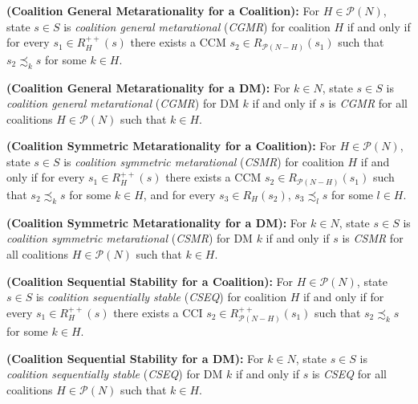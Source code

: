 \begin{definition}\label{def-cgmr-coal}
\rm {\bf (Coalition General Metarationality for a Coalition):}
For $H \in \mathcal{P}(N)$, state $s \in S$ is \emph{coalition general metarational} (\emph{CGMR}) for coalition $H$ if and only if for every $s_1 \in R_H^{++}(s)$ there exists a CCM $s_2 \in R_{\mathcal{P}(N-H)}(s_1)$ such that $s_2 \precsim_k s$ for some $k \in H$.
\end{definition}

\begin{definition}\label{def-cgmr-dm}
\rm {\bf (Coalition General Metarationality for a DM):} For $k \in N$, state $s \in S$ is \emph{coalition general metarational} (\emph{CGMR}) for DM $k$ if and only if $s$ is \emph{CGMR} for all coalitions $H \in \mathcal{P}(N)$ such that $k \in H$.
\end{definition}

\begin{definition}\label{def-csmr-coal}
\rm {\bf (Coalition Symmetric Metarationality for a Coalition):} For $H \in \mathcal{P}(N)$, state $s \in S$ is \emph{coalition symmetric metarational} (\emph{CSMR}) for coalition $H$ if and only if for every $s_1 \in R_H^{++}(s)$ there exists a CCM $s_2 \in R_{\mathcal{P}(N-H)}(s_1)$ such that $s_2 \precsim_k s$ for some $k \in H$, and for every $s_3 \in R_H(s_2)$, $s_3 \precsim_l s$ for some $l \in H$.
\end{definition}

\begin{definition}\label{def-csmr-dm}
\rm {\bf (Coalition Symmetric Metarationality for a DM):} For $k \in N$, state $s \in S$ is \emph{coalition symmetric metarational} (\emph{CSMR}) for DM $k$ if and only if $s$ is \emph{CSMR} for all coalitions $H \in \mathcal{P}(N)$ such that $k \in H$.
\end{definition}

\begin{definition}\label{def-cseq-coal}
\rm {\bf (Coalition Sequential Stability for a Coalition):}
For $H \in \mathcal{P}(N)$, state $s \in S$ is \emph{coalition sequentially stable} (\emph{CSEQ}) for coalition $H$ if and only if for every $s_1 \in R_H^{++}(s)$ there exists a CCI $s_2 \in R_{\mathcal{P}(N-H)}^{++}(s_1)$ such that $s_2 \precsim_k s$ for some $k \in H$.
\end{definition}

\begin{definition}\label{def-cseq-dm}
\rm {\bf (Coalition Sequential Stability for a DM):} For $k \in N$, state $s \in S$ is \emph{coalition sequentially stable} (\emph{CSEQ}) for DM $k$ if and only if $s$ is \emph{CSEQ} for all coalitions $H \in \mathcal{P}(N)$ such that $k \in H$.
\end{definition}

